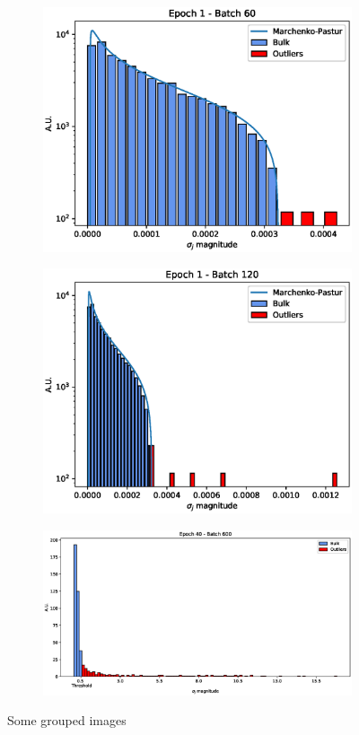 \documentclass[twocolumn]{article}
\begin{document}
\begin{figure}
\begin{subfigure}{.45\linewidth}
    \includegraphics[width=\linewidth]{sv_distr_e1_b60.eps}
    \caption{}
  \end{subfigure}
  \begin{subfigure}{.45\linewidth}
    \includegraphics[width=\linewidth]{sv_distr_e1_b120.eps}
    \caption{}  
  \end{subfigure}
  \begin{subfigure}{\linewidth}
    \includegraphics[width=\linewidth]{sv_distr_e40_b600.eps}
    \caption{}  
  \end{subfigure}
 \caption{Some grouped images}
\end{figure}
\end{document}
